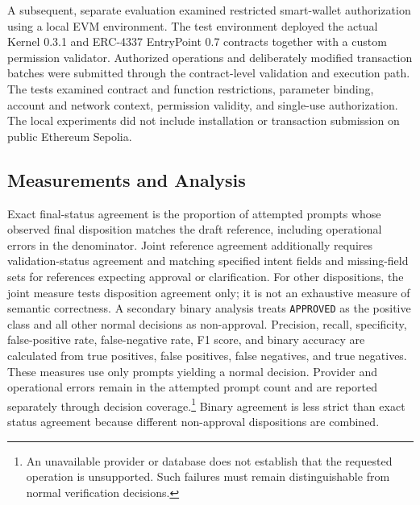 A subsequent, separate evaluation examined restricted
smart-wallet authorization using a local EVM environment.
The test environment deployed the actual Kernel 0.3.1 and
ERC-4337 EntryPoint 0.7 contracts together with a custom
permission validator. Authorized operations and deliberately
modified transaction batches were submitted through the
contract-level validation and execution path. The tests
examined contract and function restrictions, parameter
binding, account and network context, permission validity,
and single-use authorization. The local experiments did not
include installation or transaction submission on public
Ethereum Sepolia.

\subsection{Measurements and Analysis}
\label{sec:evaluation_measurements}

Exact final-status agreement is the proportion of attempted prompts whose
observed final disposition matches the draft reference, including operational
errors in the denominator. Joint reference agreement additionally requires
validation-status agreement and matching specified intent fields and
missing-field sets for references expecting approval or clarification. For
other dispositions, the joint measure tests disposition agreement only; it
is not an exhaustive measure of semantic correctness. A secondary binary analysis treats \texttt{APPROVED} as the positive class
and all other normal decisions as non-approval. Precision, recall,
specificity, false-positive rate, false-negative rate, F1 score, and binary
accuracy are calculated from true positives, false positives, false
negatives, and true negatives. These measures use only prompts yielding a
normal decision. Provider and operational errors remain in the attempted
prompt count and are reported separately through decision coverage.\footnote{
An unavailable provider or database does not establish that the requested
operation is unsupported. Such failures must remain distinguishable from
normal verification decisions.} Binary agreement is less strict than exact
status agreement because different non-approval dispositions are combined.

